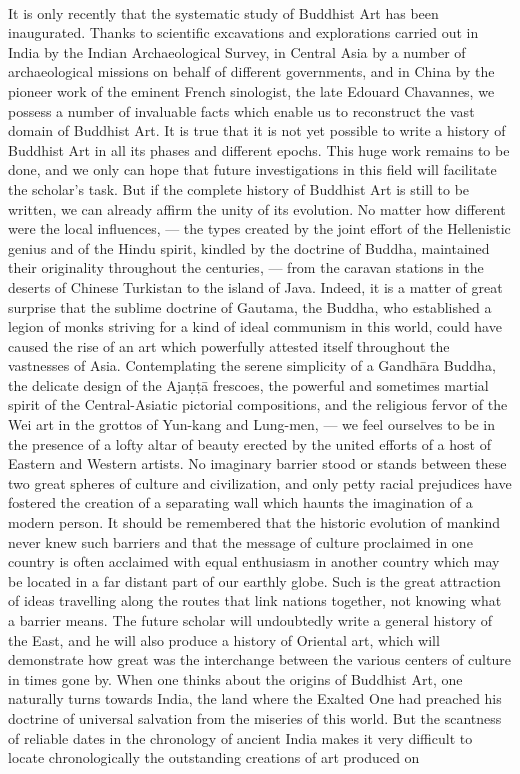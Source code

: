 \documentclass[a4paper, 12pt, oneside]{article}
\begin{document}
\paragraph{}
It is only recently that the systematic study of Buddhist Art has been inaugurated. Thanks to scientific excavations and explorations carried out in India by the Indian Archaeological Survey, in Central Asia by a number of archaeological missions on behalf of different governments, and in China by the pioneer work of the eminent French sinologist, the late Edouard Chavannes, we possess a number of invaluable facts which enable us to reconstruct the vast domain of Buddhist Art. It is true that it is not yet possible to write a history of Buddhist Art in all its phases and different epochs. This huge work remains to be done, and we only can hope that future investigations in this field will facilitate the scholar's task. But if the complete history of Buddhist Art is still to be written, we can already affirm the unity of its evolution. No matter how different were the local influences, --- the types created by the joint effort of the Hellenistic genius and of the Hindu spirit, kindled by the doctrine of Buddha, maintained their originality throughout the centuries, --- from the caravan stations in the deserts of Chinese Turkistan to the island of Java. Indeed, it is a matter of great surprise that the sublime doctrine of Gautama, the Buddha, who established a legion of monks striving for a kind of ideal communism in this world, could have caused the rise of an art which powerfully attested itself throughout the vastnesses of Asia. Contemplating the serene simplicity of a Gandh\={a}ra Buddha, the delicate design of the Aja\d{n}\d{t}\={a} frescoes, the powerful and sometimes martial spirit of the Central-Asiatic pictorial compositions, and the religious fervor of the Wei art in the grottos of Yun-kang and Lung-men, --- we feel ourselves to be in the presence of a lofty altar of beauty erected by the united efforts of a host of Eastern and Western artists. No imaginary barrier stood or stands between these two great spheres of culture and civilization, and only petty racial prejudices have fostered the creation of a separating wall which haunts the imagination of a modern person. It should be remembered that the historic evolution of mankind never knew such barriers and that the message of culture proclaimed in one country is often acclaimed with equal enthusiasm in another country which may be located in a far distant part of our earthly globe. Such is the great attraction of ideas travelling along the routes that link nations together, not knowing what a barrier means. The future scholar will undoubtedly write a general history of the East, and he will also produce a history of Oriental art, which will demonstrate how great was the interchange between the various centers of culture in times gone by. When one thinks about the origins of Buddhist Art, one naturally turns towards India, the land where the Exalted One had preached his doctrine of universal salvation from the miseries of this world. But the scantness of reliable dates in the chronology of ancient India makes it very difficult to locate chronologically the outstanding creations of art produced on 
\end{document}
